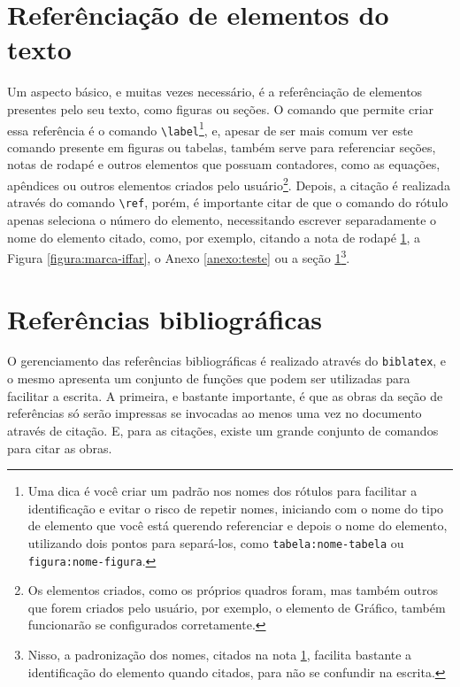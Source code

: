 \section{Referênciação de elementos do texto}\label{section:referencia}
Um aspecto básico, e muitas vezes necessário, é a referênciação de elementos presentes pelo seu texto, como figuras ou seções. O comando que permite criar essa referência é o comando \verb|\label|\footnote{\label{rodape:exemplo-ref}Uma dica é você criar um padrão nos nomes dos rótulos para facilitar a identificação e evitar o risco de repetir nomes, iniciando com o nome do tipo de elemento que você está querendo referenciar e depois o nome do elemento, utilizando dois pontos para separá-los, como \texttt{tabela:nome-tabela} ou \texttt{figura:nome-figura}.}, 
e, apesar de ser mais comum ver este comando presente em figuras ou tabelas, também serve para referenciar seções, notas de rodapé e outros elementos que possuam contadores, como as equações, apêndices ou outros elementos criados pelo usuário\footnote{Os elementos criados, como os próprios quadros foram, mas também outros que forem criados pelo usuário, por exemplo, o elemento de Gráfico, também funcionarão se configurados corretamente.}. 
Depois, a citação é realizada através do comando \verb|\ref|, porém, é importante citar de que o comando do rótulo apenas seleciona o número do elemento, necessitando escrever separadamente o nome do elemento citado, como, por exemplo, citando a nota de rodapé \ref{rodape:exemplo-ref}, a Figura \ref{figura:marca-iffar}, o Anexo \ref{anexo:teste} ou a seção \ref{section:referencia}\footnote{Nisso, a padronização dos nomes, citados na nota \ref{rodape:exemplo-ref}, facilita bastante a identificação do elemento quando citados, para não se confundir na escrita.}. %

\section{Referências bibliográficas}
O gerenciamento das referências bibliográficas é realizado através do \verb|biblatex|, e o mesmo apresenta um conjunto de funções que podem ser utilizadas para facilitar a escrita. A primeira, e bastante importante, é que as obras da seção de referências só serão impressas se invocadas ao menos uma vez no documento através de citação. E, para as citações, existe um grande conjunto de comandos para citar as obras.

